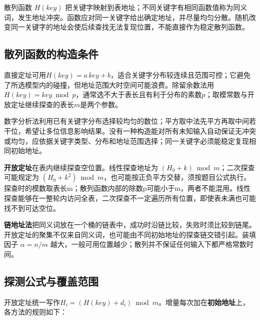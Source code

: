 散列函数 \(H(key)\) 把关键字映射到表地址；不同关键字有相同函数值称为同义词，发生地址冲突。函数应对同一关键字给出确定地址，并尽量均匀分散。随机改变同一关键字的地址会使后续查找无法复现位置，不能直接作为稳定散列函数。

\subsection{散列函数的构造条件}\label{DS07-hash-functions}

直接定址可用\(H(key)=a\,key+b\)，适合关键字分布较连续且范围可控；它避免了所选模型内的碰撞，但地址范围大时空间可能浪费。除留余数法用\(H(key)=key\bmod p\)，通常选不大于表长且有利于分布的素数\(p\)；取模常数与开放定址继续探查的表长\(m\)是两个参数。

数字分析法利用已有关键字分布选择较均匀的数位；平方取中法先平方再取中间若干位，希望让多位信息影响结果。没有一种构造能对所有未知输入自动保证无冲突或均匀，应依据关键字类型、分布和地址范围选择；同一关键字必须能稳定复现相同初始地址。

\textbf{开放定址}在表内继续探查空位置。线性探查地址为 \((H_0+k)\bmod m\)；二次探查可能规定为 \((H_0+k^2)\bmod m\)，也可能按正负平方交替，须按题目公式执行。探查时的模数取表长m；散列函数内部的除数p可能小于m，两者不能混用。线性探查能够在一整轮内访问全表，二次探查不一定遍历所有位置，即使表未满也可能找不到可达空位。

\textbf{链地址法}把同义词放在一个桶的链表中，成功时沿链比较，失败时须比较到链尾。开放定址的聚集不仅来自同义词，也可能由不同初始地址的探查链交错引起。装填因子 \(\alpha=n/m\) 越大，一般可用位置越少；散列并不保证任何输入下都严格常数时间。

\subsection{探测公式与覆盖范围}\label{DS07-hash-probes}

开放定址统一写作\(H_i=(H(key)+d_i)\bmod m\)。增量每次加在\textbf{初始地址}上，各方法的规则如下：

